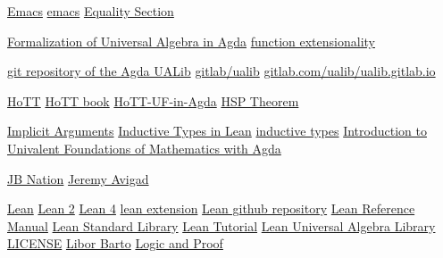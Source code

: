 \href{https://www.gnu.org/software/emacs/}{Emacs}
\href{https://www.gnu.org/software/emacs/}{emacs}
\href{https://leanprover.github.io/logic_and_proof/first_order_logic.html?highlight=equality#equality}{Equality Section}

\href{http://www.sciencedirect.com/science/article/pii/S1571066118300768}{Formalization of Universal Algebra in Agda}
\href{https://ncatlab.org/nlab/show/function+extensionality}{function extensionality}

\href{https://gitlab.com/ualib/ualib.gitlab.io/}{git repository of the Agda UALib}
\href{https://gitlab.com/ualib/ualib.gitlab.io/}{gitlab/ualib}
\href{https://gitlab.com/ualib/ualib.gitlab.io}{gitlab.com/ualib/ualib.gitlab.io}

\href{https://homotopytypetheory.org/}{HoTT}
\href{https://homotopytypetheory.org/book/}{HoTT book}
\href{https://www.cs.bham.ac.uk/~mhe/HoTT-UF-in-Agda-Lecture-Notes/HoTT-UF-Agda.html}{HoTT-UF-in-Agda}
\href{https://en.wikipedia.org/wiki/Variety_(universal_algebra)#Birkhoff's_theorem}{HSP Theorem}

\href{https://leanprover.github.io/theorem_proving_in_lean/dependent_type_theory.html#implicit-arguments}{Implicit Arguments}
\href{https://leanprover.github.io/theorem_proving_in_lean/inductive_types.html}{Inductive Types in Lean}
\href{https://en.wikipedia.org/wiki/Intuitionistic_type_theory#Inductive_types}{inductive types}
\href{https://www.cs.bham.ac.uk/~mhe/HoTT-UF-in-Agda-Lecture-Notes/index.html}{Introduction to Univalent Foundations of Mathematics with Agda}

\href{http://www.math.hawaii.edu/~jb/}{JB Nation}
\href{http://www.andrew.cmu.edu/user/avigad/}{Jeremy Avigad}

\href{https://leanprover.github.io/}{Lean}
\href{https://github.com/leanprover/lean2}{Lean 2}
\href{https://github.com/leanprover/lean4}{Lean 4}
\href{https://github.com/leanprover/vscode-lean}{lean extension}
\href{https://github.com/leanprover/lean/}{Lean github repository}
\href{https://leanprover.github.io/reference/}{Lean Reference Manual}
\href{https://github.com/leanprover/lean}{Lean Standard Library}
\href{https://leanprover.github.io/tutorial/}{Lean Tutorial}
\href{https://github.com/UniversalAlgebra/lean-ualib/}{Lean Universal Algebra Library}
\href{https://gitlab.com/ualib/ualib.gitlab.io/-/blob/master/LICENSE}{LICENSE}
\href{http://www.karlin.mff.cuni.cz/~barto/}{Libor Barto}
\href{https://leanprover.github.io/logic_and_proof/}{Logic and Proof}

